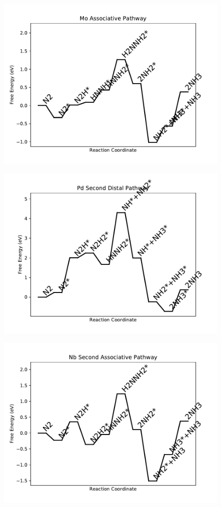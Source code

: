 \begin{figure}
\centering
\includegraphics[width=0.8\linewidth]{data/plots/Mo_associative.pdf}
\end{figure}

\begin{figure}
\centering
\includegraphics[width=0.8\linewidth]{data/plots/Pd_distal_2.pdf}
\end{figure}

\begin{figure}
\centering
\includegraphics[width=0.8\linewidth]{data/plots/Nb_associative_2.pdf}
\end{figure}

